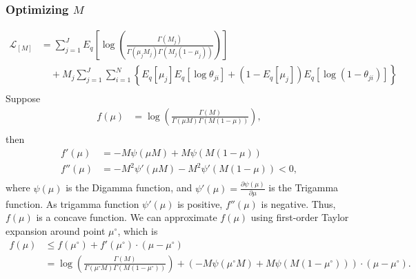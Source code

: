 \documentclass[11pt,reqno]{amsart}
\begin{document}
\subsubsection{Optimizing $ M $}
\begin{equation}
\begin{split}
\mathcal{L}_{{[M]}}
&= \sum_{j=1}^{J} E_q  \left[ \log \left( \frac{ \Gamma(M_j) } { \Gamma(\mu_j M_j) \Gamma(M_j (1-\mu_j)) }\right) \right] \\
&\quad + M_j \sum_{j=1}^{J} \sum_{i=1}^{N} \left\lbrace E_q \left[ \mu_j \right] E_q \left[ \log \theta_{ji} \right] + \left( 1 - E_q\left[ \mu_j \right]  \right) E_q\left[ \log \left( 1 - \theta_{ji}\right) \right] \right\rbrace \\
\end{split}
\end{equation}
Suppose
\begin{equation}
\begin{split}
f(\mu) &= \log\left( \frac{\Gamma(M)}{\Gamma(\mu M) \Gamma(M (1-\mu ))}\right) \nonumber, \\
\end{split}
\end{equation}
then
\begin{align}
f'(\mu) &= -M \psi (\mu M) + M \psi(M (1-\mu )) \nonumber \\
f''(\mu) &= -M^2 \psi ' (\mu M) - M^2 \psi '(M (1-\mu )) <0 \nonumber, \\
\end{align}
where $ \psi(\mu) $ is the Digamma function, and $ \psi'(\mu)= \frac{\partial \psi(\mu)}{\partial \mu}$ is the Trigamma function. As trigamma function $ \psi'(\mu) $ is positive, $ f''(\mu) $ is negative.
Thus, $ f(\mu) $ is a concave function.
We can approximate $ f(\mu) $ using first-order Taylor expansion around point $ \mu^{\circ} $, which is
\begin{equation}
\begin{split}
f(\mu) &\leq f(\mu^{\circ}) + f'(\mu^{\circ}) \cdot (\mu-\mu^{\circ}) \nonumber \\
&= \log\left( \frac{\Gamma(M)}{\Gamma(\mu^{\circ} M) \Gamma(M (1-\mu^{\circ} ))}\right) + \left( -M \psi (\mu^{\circ} M) + M \psi(M (1-\mu^{\circ} ))\right) \cdot (\mu-\mu^{\circ}).
\end{split}
\end{equation}
\end{document}

